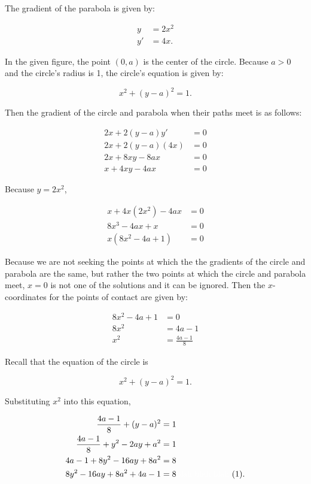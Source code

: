 \documentclass{article}
\begin{document}
    The gradient of the parabola is given by:

    \begin{align*}
        y   &= 2x^2 \\
        y'   &= 4x.
    \end{align*}

    In the given figure, the point $(0,a)$ is the center of the circle. Because $a>0$ and the circle's radius is 1, the circle's equation is given by:

    \[
        x^2 + (y-a)^2   = 1.
    \]

    Then the gradient of the circle and parabola when their paths meet is as follows:

    \begin{align*}
        2x + 2(y-a)y'   &= 0 \\
        2x + 2(y-a)(4x) &= 0 \\
        2x + 8xy - 8ax  &= 0 \\
        x + 4xy - 4ax   &= 0
    \end{align*}

    Because $y=2x^2$,

    \begin{align*}
        x + 4x(2x^2) - 4ax  &= 0 \\
        8x^3 - 4ax + x      &= 0 \\
        x(8x^2 - 4a + 1)    &= 0
    \end{align*}

    Because we are not seeking the points at which the the gradients of the circle and parabola are the same, but rather the two points at which the circle and parabola meet, $x=0$ is not one of the solutions and it
    can be ignored. Then the $x$-coordinates for the points of contact are given by:

    \begin{align*}
        8x^2 - 4a + 1   &= 0 \\
        8x^2 &= 4a - 1 \\
        x^2  &= \frac{4a-1}{8}
    \end{align*}

    Recall that the equation of the circle is

    \[
        x^2 + (y-a)^2 = 1.
    \]

    Substituting $x^2$ into this equation,

    \begin{align*}
        \frac{4a-1}{8} + (y-a)^2         &= 1 \\
        \frac{4a-1}{8} + y^2 - 2ay + a^2 &= 1 \\
        4a - 1+ 8y^2 - 16ay + 8a^2       &= 8 \\
        8y^2 - 16ay + 8a^2 + 4a - 1      &= 8 \text{\color{white}blah blah blah \color{black}(1)}.
    \end{align*}
\end{document}
